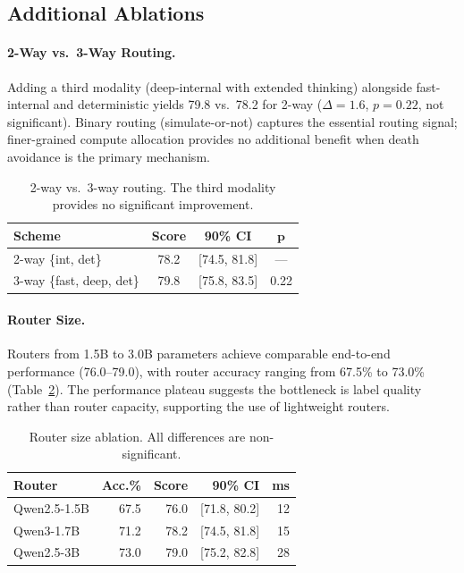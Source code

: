 \documentclass[11pt,a4paper]{article}
\begin{document}
\subsection{Additional Ablations}

\paragraph{2-Way vs.\ 3-Way Routing.} Adding a third modality (deep-internal with extended thinking) alongside fast-internal and deterministic yields 79.8 vs.\ 78.2 for 2-way ($\Delta{=}1.6$, $p{=}0.22$, not significant). Binary routing (simulate-or-not) captures the essential routing signal; finer-grained compute allocation provides no additional benefit when death avoidance is the primary mechanism.

\begin{table}[t]
\centering
\small
\begin{tabular}{@{}lccc@{}}
\toprule
\textbf{Scheme} & \textbf{Score} & \textbf{90\% CI} & $\boldsymbol{p}$ \\
\midrule
2-way \{int, det\} & 78.2 & [74.5, 81.8] & --- \\
3-way \{fast, deep, det\} & 79.8 & [75.8, 83.5] & 0.22 \\
\bottomrule
\end{tabular}
\caption{2-way vs.\ 3-way routing. The third modality provides no significant improvement.}
\label{tab:2v3}
\end{table}

\paragraph{Router Size.} Routers from 1.5B to 3.0B parameters achieve comparable end-to-end performance (76.0--79.0), with router accuracy ranging from 67.5\% to 73.0\% (Table~\ref{tab:routersize}). The performance plateau suggests the bottleneck is label quality rather than router capacity, supporting the use of lightweight routers.

\begin{table}[t]
\centering
\small
\begin{tabular}{@{}lrrrr@{}}
\toprule
\textbf{Router} & \textbf{Acc.\%} & \textbf{Score} & \textbf{90\% CI} & \textbf{ms} \\
\midrule
Qwen2.5-1.5B & 67.5 & 76.0 & [71.8, 80.2] & 12 \\
Qwen3-1.7B & 71.2 & 78.2 & [74.5, 81.8] & 15 \\
Qwen2.5-3B & 73.0 & 79.0 & [75.2, 82.8] & 28 \\
\bottomrule
\end{tabular}
\caption{Router size ablation. All differences are non-significant.}
\label{tab:routersize}
\end{table}
\end{document}
